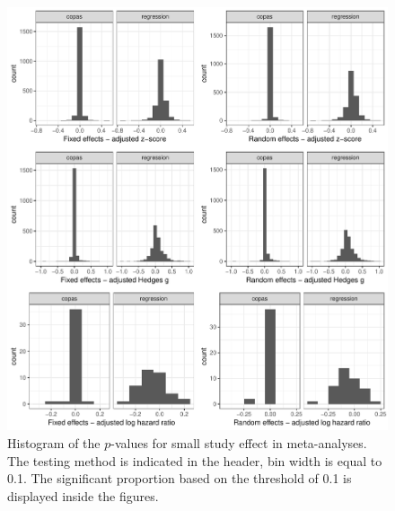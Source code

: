 \begin{figure}
\begin{knitrout}
\color{fgcolor}

{\centering \includegraphics[width=\textwidth-3cm]{figure/ch03_figunnamed-chunk-15-1} 

}



\end{knitrout}
\caption{Histogram of the $p$-values for small study effect in meta-analyses. The testing method is indicated in the header, bin width is equal to 0.1. The significant proportion based on the threshold of 0.1 is displayed inside the figures.}
\label{fig:test.corrected}
\end{figure}


